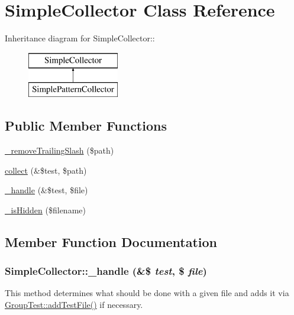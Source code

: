 \hypertarget{class_simple_collector}{
\section{SimpleCollector Class Reference}
\label{class_simple_collector}
}
Inheritance diagram for SimpleCollector::\begin{figure}[H]
\begin{center}
\leavevmode
\includegraphics[height=2cm]{class_simple_collector}
\end{center}
\end{figure}
\subsection*{Public Member Functions}
\begin{DoxyCompactItemize}
\item 
\hyperlink{class_simple_collector_a566985ed6765d322b17541372675ac00}{\_\-removeTrailingSlash} (\$path)
\item 
\hyperlink{class_simple_collector_a0dcaa770d0dd18b8be96ecb26170a80d}{collect} (\&\$test, \$path)
\item 
\hyperlink{class_simple_collector_ae243b0fe94a9437b34b1b30aa636610e}{\_\-handle} (\&\$test, \$file)
\item 
\hyperlink{class_simple_collector_ad7993988a2f4e60d1fa5a89efe38a57b}{\_\-isHidden} (\$filename)
\end{DoxyCompactItemize}


\subsection{Member Function Documentation}
\hypertarget{class_simple_collector_ae243b0fe94a9437b34b1b30aa636610e}{
\subsubsection[{\_\-handle}]{\setlength{\rightskip}{0pt plus 5cm}SimpleCollector::\_\-handle (\&\$ {\em test}, \/  \$ {\em file})}}
\label{class_simple_collector_ae243b0fe94a9437b34b1b30aa636610e}
This method determines what should be done with a given file and adds it via \hyperlink{}{GroupTest::addTestFile()} if necessary.

